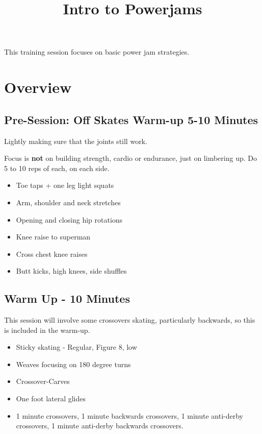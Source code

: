 \documentclass{journal}
\title{Intro to Powerjams}
\author{}
\begin{document}
\maketitle
\noindent 

This training session focuses on basic power jam strategies.

\section*{Overview}

\subsection*{Pre-Session: Off Skates Warm-up 5-10 Minutes}
Lightly making sure that the joints still work.

Focus is {\bf not} on building strength, cardio or endurance, just on limbering up. Do 5 to 10 reps of each, on each side. 

\begin{itemize}
\item Toe taps + one leg light squats
\item Arm, shoulder and neck stretches
\item Opening and closing hip rotations
\item Knee raise to superman 
\item Cross chest knee raises
\item Butt kicks, high knees, side shuffles
\end{itemize}


\subsection*{Warm Up - 10 Minutes}

This session will involve some crossovers skating, particularly backwards, so this is included in the warm-up.

\begin{itemize}
\item Sticky skating - Regular, Figure 8, low
\item Weaves focusing on 180 degree turns 
\item Crossover-Carves
\item One foot lateral glides
\item 1 minute crossovers, 1 minute backwards crossovers, 1 minute anti-derby crossovers, 1 minute anti-derby backwards crossovers.  
\end{itemize}
\end{document}
